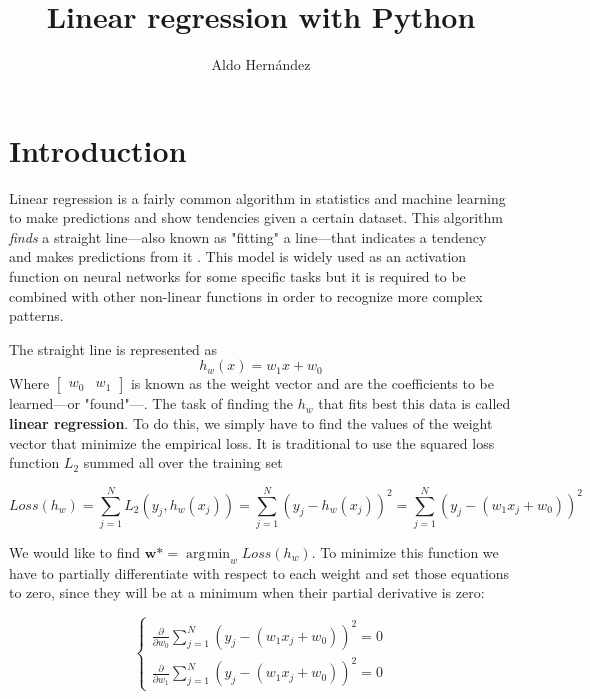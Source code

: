 \documentclass[10pt]{article}
\DeclareMathOperator*{\argmin}{\arg\!\min}
\begin{document}
\begin{opening}
  \title{Linear regression with Python}
  \author[Universidad Autónoma de Nuevo León, San Nicolás de los Garza, aldo.hernandezt@uanl.edu.mx]{Aldo Hernández}

  \begin{abstract}
  \end{abstract}

\end{opening}

\section{Introduction}
Linear regression is a fairly common algorithm in statistics and machine learning to make predictions and show tendencies given a certain dataset. This algorithm \textit{finds} a straight line---also known as "fitting" a line---that indicates a tendency and makes predictions from it \cite{aprendeML}. This model is widely used as an activation function on neural networks for some specific tasks but it is required to be combined with other non-linear functions in order to recognize more complex patterns. \par
The straight line is represented as
\begin{equation*}
    h_{w}(x) = w_{1}x + w_{0}
\end{equation*}
Where $\begin{bmatrix} w_{0} & w_{1} \end{bmatrix}$ is known as the weight vector and are the coefficients to be learned---or "found"---. The task of finding the $h_{w}$ that fits best this data is called \textbf{linear regression}. To do this, we simply have to find the values of the weight vector that minimize the empirical loss. It is traditional to use the squared loss function $L_{2}$ summed all over the training set \cite{ai} \par
\begin{equation*}
    Loss(h_{w}) = \sum_{j=1}^{N}L_{2}(y_{j}, h_{w}(x_{j})) = \sum_{j=1}^{N}(y_{j} - h_{w}(x_{j}))^{2} = \sum_{j=1}^{N}(y_{j} - (w_{1}x_{j} + w_{0}))^{2}
\end{equation*}

We would like to find $\textbf{w*} = \argmin_{w} Loss(h_{w})$. To minimize this function we have to partially differentiate with respect to each weight and set those equations to zero, since they will be at a minimum when their partial derivative is zero: \par
\begin{equation*}
    \begin{cases}
        \frac{\partial}{\partial w_{0}} \sum_{j=1}^{N}(y_{j} - (w_{1}x_{j} + w_{0}))^{2} = 0 \\
        \frac{\partial}{\partial w_{1}} \sum_{j=1}^{N}(y_{j} - (w_{1}x_{j} + w_{0}))^{2} = 0
    \end{cases} 
\end{equation*}
\end{document}
